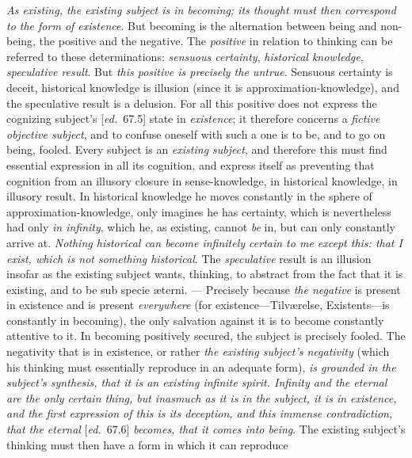 \documentclass[12pt,a4paper,openany]{book}
\newcommand{\kpage}[1]{\marginnote{\footnotesize\textit{[#1]}}}
\newcommand{\ed}[1]{{\small[\textit{ed.}\ #1]}}
\begin{document}
\emph{As existing, the existing subject is in becoming; its thought must then
correspond to the form of existence}. But becoming is the alternation between
being and non-being, the positive and the negative. The \emph{positive} in
relation to thinking can be referred to these determinations: \emph{sensuous
certainty}, \emph{historical knowledge}, \emph{speculative result}. But
\emph{this positive is precisely the untrue}. Sensuous certainty is deceit,
historical knowledge is illusion
\kpage{112}(since it is approximation-knowledge), and the speculative result
is a delusion. For all this positive does not express the cognizing
subject's \ed{67.5} state in \emph{existence}; it therefore concerns a \emph{fictive
objective subject}, and to confuse oneself with such a one is to be,
and to go on being, fooled. Every subject is an \emph{existing subject}, and therefore
this must find essential expression in all its cognition, and express itself
as preventing that cognition from an illusory closure in sense-knowledge, in historical
knowledge, in illusory result. In historical knowledge he moves
constantly in the sphere of approximation-knowledge, only imagines he
has certainty, which is nevertheless had only \emph{in infinity}, which he, as
existing, cannot \emph{be} in, but can only constantly arrive at. \emph{Nothing historical
can become infinitely certain to me except this: that I exist, which is not something historical}.
The \emph{speculative} result is an illusion insofar as the existing
subject wants, thinking, to abstract from the fact that it is existing, and to be
sub specie æterni. --- Precisely because \emph{the negative} is present in existence
and is present \emph{everywhere} (for existence---Tilværelse, Existents---is constantly in becoming),
the only salvation against it is to become constantly
attentive to it. In becoming positively secured, the subject is
precisely fooled. The negativity that is in existence, or rather \emph{the
existing subject's negativity} (which his thinking must essentially
reproduce in an adequate form), \emph{is grounded in the subject's synthesis, that it is an
existing infinite spirit. Infinity and the eternal are the only certain thing, but inasmuch as
it is in the subject, it is in existence, and the first expression of this is its deception, and
this immense contradiction, that the eternal} \ed{67.6} \emph{becomes, that it comes into being}. The existing
subject's thinking must then have a form in which it can reproduce
\end{document}
